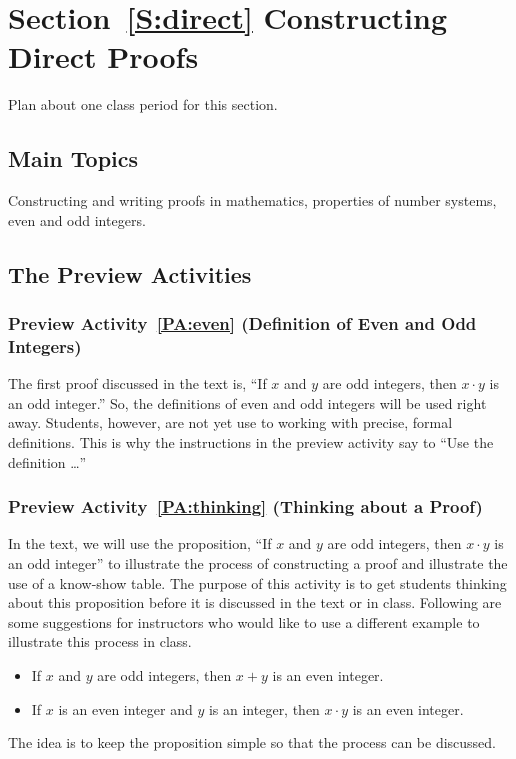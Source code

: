 \section*{Section~\ref{S:direct} Constructing Direct Proofs}
Plan about one class period for this section.

\subsection*{Main Topics}
Constructing and writing proofs in mathematics, properties of number systems, even and odd integers.  

\subsection*{The Preview Activities}
\subsubsection*{Preview Activity~\ref{PA:even} (Definition of Even and Odd Integers)}  
The first proof discussed in the text is, ``If $x$ and $y$ are odd integers, then $x \cdot y$ is an odd integer.''  So, the definitions of even and odd integers will be used right away.  Students, however, are not yet use to working with precise, formal definitions.  This is why the instructions in the preview activity say to ``Use the definition \ldots''

\subsubsection*{Preview Activity~\ref{PA:thinking} (Thinking about a Proof)}  In the text, we will use the proposition, ``If $x$ and $y$ are odd integers, then $x \cdot y$ is an odd integer'' to illustrate the process of constructing a proof and illustrate the use of a know-show table.  The purpose of this activity is to get students thinking about this proposition before it is discussed in the text or in class.  Following are some suggestions for instructors who would like to use a different example to illustrate this process in class.
\begin{itemize}
\item If $x$ and $y$ are odd integers, then $x + y$ is an even integer.
\item If $x$ is an even integer and $y$ is an integer, then $x \cdot y$ is an even integer.
\end{itemize}
The idea is to keep the proposition simple so that the process can be discussed.
\hbreak

